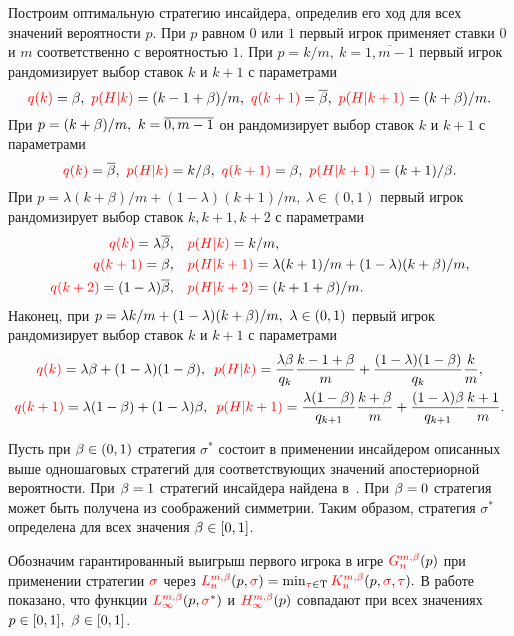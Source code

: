 Построим оптимальную стратегию инсайдера, определив его ход для всех значений вероятности $p$.
При $p$ равном $0$ или $1$ первый игрок применяет ставки $0$ и $m$ соответственно с вероятностью $1$.
При $p = k/m,\ k = \overline{1, m-1}$ первый игрок рандомизирует выбор ставок $k$ и $k+1$ с параметрами
\begin{equation*}
  \textcolor{red}{q(k)} = \beta,\ \textcolor{red}{p(H|k)} = (k-1+\beta)/m,\
  \textcolor{red}{q(k+1)} = {{\overline{\beta}}},\ \textcolor{red}{p(H|k + 1)} = (k+\beta)/m.
\end{equation*}
При $p = (k+\beta)/m,\ k = \overline{0, m-1}$ он рандомизирует выбор ставок $k$ и $k+1$ с параметрами
\begin{equation*}
  \textcolor{red}{q(k)} = {{\overline{\beta}}},\ \textcolor{red}{p(H|k)} = k/\beta,\
  \textcolor{red}{q(k+1)} = \beta,\ \textcolor{red}{p(H|k+1)} = (k+1)/\beta.
\end{equation*}
При $p = \lambda (k+\beta)/m + (1-\lambda) (k+1)/m,\ \lambda \in (0, 1)$ первый игрок рандомизирует выбор ставок $k, k+1, k+2$ с параметрами
\begin{align*}
  \textcolor{red}{q(k)} = \lambda{{\overline{\beta}}}, &\quad \textcolor{red}{p(H|k)} = k/m,\\
  \textcolor{red}{q(k+1)} = \beta, &\quad \textcolor{red}{p(H|k+1)} = \lambda (k+1)/m + (1-\lambda) (k+\beta)/m,\\
  \textcolor{red}{q(k+2)} = (1-\lambda){{\overline{\beta}}}, &\quad \textcolor{red}{p(H|k+2)} = (k+1+\beta)/m.
\end{align*}
Наконец, при $p = \lambda k/m + (1-\lambda) (k+\beta)/m,\ \lambda \in (0, 1)$ первый игрок рандомизирует выбор ставок $k$ и $k+1$ с параметрами
\begin{gather*}
  \textcolor{red}{q(k)} = \lambda\beta + (1-\lambda)(1-\beta),\enskip
  \textcolor{red}{p(H|k)} = \frac{\lambda\beta}{q_k} \frac{k-1+\beta}{m} + \frac{(1-\lambda)(1-\beta)}{q_k} \frac{k}{m},\\
  \textcolor{red}{q(k+1)} = \lambda(1-\beta) + (1-\lambda)\beta,\enskip
  \textcolor{red}{p(H|k+1)} = \frac{\lambda(1-\beta)}{q_{k+1}} \frac{k+\beta}{m} + \frac{(1-\lambda)\beta}{q_{k+1}} \frac{k+1}{m}.
\end{gather*}

Пусть при $\beta \in (0,1)$ стратегия $\sigma^*$ состоит в применении инсайдером описанных выше одношаговых стратегий для соответствующих значений апостериорной вероятности. 
При $\beta = 1$ стратегий инсайдера найдена в~\cite{domansky07}.
При $\beta = 0$ стратегия может быть получена из соображений симметрии. 
Таким образом, стратегия $\sigma^*$ определена для всех значения $\beta \in [0,1]$.

Обозначим гарантированный выигрыш первого игрока в игре $\theG*{n}(p)$ при применении стратегии $\textcolor{red}{\sigma}$ через
$
  \L*{n}(p, \sigmar) = \min_{\taur \in \Tau} \K*{n}(p,\sigmar,\taur).
$
В работе показано, что функции $\L*{\infty}(p, \sigmar^*)$ и $\H*{\infty}(p)$ совпадают при всех значениях $p \in [0,1],\ \beta \in [0,1]$.

